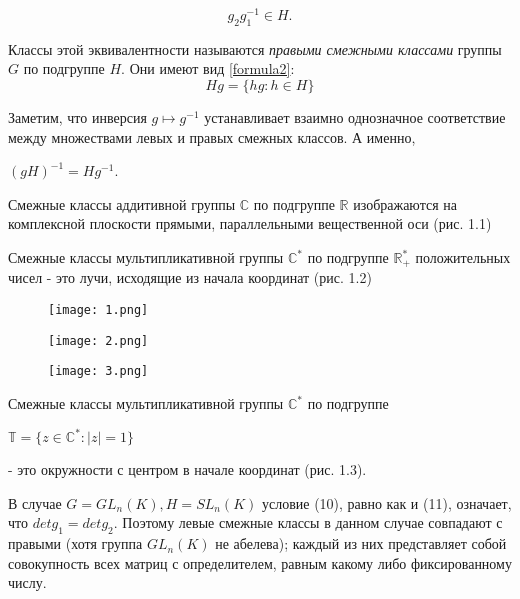 \begin{equation}
g_2 g_1^{-1} \in H.
\end{equation}

\noindent Классы этой эквивалентности называются \emph{правыми смежными классами} группы $G$ по подгруппе $H$. Они имеют вид \eqref{formula2}:
\begin{equation} \label{formula2} Hg = \{hg: h \in H\} \end{equation}

Заметим, что инверсия $g \mapsto g^{-1}$ устанавливает взаимно однозначное соответствие между множествами левых и правых смежных классов. А именно,

\begin{center}
$(gH)^{-1} = Hg^{-1}$.            
\end{center}

\begin{example}
Смежные классы аддитивной группы $\mathbb{C}$ по подгруппе $\mathbb{R}$ изображаются на комплексной плоскости прямыми, параллельными вещественной оси (рис. 1.1)
\end{example}

\begin{example}
Смежные классы мультипликативной группы $\mathbb{C^*}$ по подгруппе $\mathbb{R_+^{*}}$ положительных чисел - это лучи, исходящие из начала координат (рис. 1.2)
\end{example}

\begin{figure}[H]
\begin{multicols}{3}
\hfill
\texttt{[image: 1.png]}
\hfill
\caption{}
\label{figLeft}
\hfill
\texttt{[image: 2.png]}
\hfill
\caption{}
\label{figCenter}
\hfill
\texttt{[image: 3.png]}
\hfill
\caption{}
\label{figRight}
\end{multicols}
\end{figure}

\begin{example}
Смежные классы мультипликативной группы $\mathbb{C^*}$ по подгруппе
\begin{center}
$\mathbb{T} = \{z \in \mathbb{C^*}: |z| = 1\}$
\end{center}
- это окружности с центром в начале координат (рис. 1.3).
\end{example}

\begin{example}
В случае $G = GL_n(K), H = SL_n(K)$ условие (10), равно как и (11), означает, что $det g_1 = det g_2$. Поэтому левые смежные классы в данном случае совпадают с правыми (хотя группа $GL_n(K)$ не абелева); каждый из них представляет собой совокупность всех матриц с определителем, равным какому либо фиксированному числу.
\end{example}

